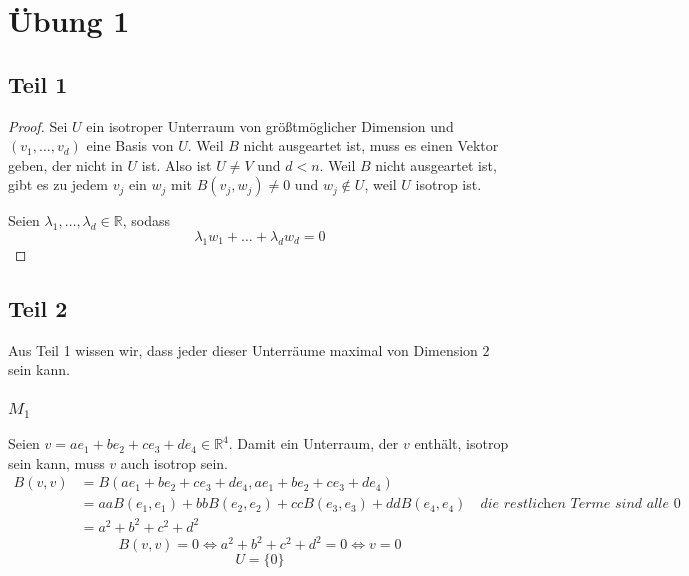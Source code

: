\documentclass[10pt,a4paper]{article}
\begin{document}
\section*{Übung 1}

\subsection*{Teil 1}

\begin{proof}
Sei $U$ ein isotroper Unterraum von größtmöglicher Dimension und $(v_{1}, \dots, v_{d})$ eine Basis von $U$.
Weil $B$ nicht ausgeartet ist, muss es einen Vektor geben, der nicht in $U$ ist.
Also ist $U \ne V$ und $d < n$.
Weil $B$ nicht ausgeartet ist, gibt es zu jedem $v_{j}$ ein $w_{j}$ mit $B(v_{j}, w_{j}) \ne 0$ und $w_{j} \notin U$, weil $U$ isotrop ist.

Seien $\lambda_{1}, \dots, \lambda_{d} \in \mathbb{R}$, sodass
\begin{equation}
\lambda_{1} w_{1} + \dots + \lambda_{d} w_{d} = 0
\end{equation}
\end{proof}

\subsection*{Teil 2}

Aus Teil 1 wissen wir, dass jeder dieser Unterräume maximal von Dimension $2$ sein kann.

\subsubsection*{$M_{1}$}

Seien $v = ae_{1} + be_{2} + ce_{3} + de_{4} \in \mathbb{R}^{4}$.
Damit ein Unterraum, der $v$ enthält, isotrop sein kann, muss $v$ auch isotrop sein.
\begin{align*}
B(v, v) & = B(ae_{1} + be_{2} + ce_{3} + de_{4}, ae_{1} + be_{2} + ce_{3} + de_{4})\\
& = aa B(e_{1}, e_{1}) + bb B(e_{2}, e_{2}) + cc B(e_{3}, e_{3}) + dd B(e_{4}, e_{4}) \quad \textit{die restlichen Terme sind alle 0}\\
& = a^{2} + b^{2} + c^{2} + d^{2}
\end{align*}
\begin{equation}
B(v, v) = 0 \Leftrightarrow a^{2} + b^{2} + c^{2} + d^{2} = 0 \Leftrightarrow v = 0
\end{equation}
\begin{equation}
U = \{ 0 \}
\end{equation}
\end{document}
